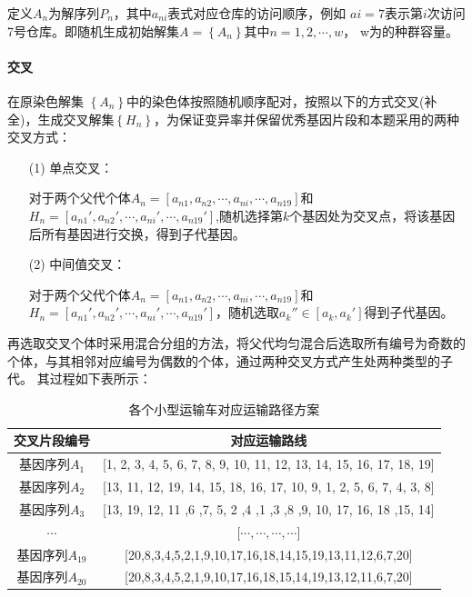 \documentclass{whutmod}
\begin{document}
        定义$A_n$为解序列$P_{n}$，其中$a_{ni}$表式对应仓库的访问顺序，例如 $a{i}=7$表示第$i$次访问7号仓库。即随机生成初始解集$A=\left \{A_n\right \}$其中$n=1,2,\cdots,w$， w为的种群容量。
        
        \paragraph{交叉}
        在原染色解集 $\left \{ A_n \right \}$中的染色体按照随机顺序配对，按照以下的方式交叉(补全)，生成交叉解集$\left \{H_n\right \}$，为保证变异率并保留优秀基因片段和本题采用的两种交叉方式：
        
        \begin{itemize}
        	\item [(1)]单点交叉：
        	
        	对于两个父代个体$ A_n=[a_{n1},a_{n2},\cdots,a_{ni},\cdots,a_{n19}]$和$H_n=[a_{n1}',a_{n2}',\cdots,a_{ni}',\cdots,a_{n19}']$,随机选择第$k$个基因处为交叉点，将该基因后所有基因进行交换，得到子代基因。
        	\item [(2)]中间值交叉：
        	
        	对于两个父代个体$ A_n=[a_{n1},a_{n2},\cdots,a_{ni},\cdots,a_{n19}]$和	$H_n=[a_{n1}',a_{n2}',\cdots,a_{ni}',\cdots,a_{n19}']$，随机选取$a_{k}''\in [a_{k},a_{k}']$得到子代基因。
        \end{itemize}
        再选取交叉个体时采用混合分组的方法，将父代均匀混合后选取所有编号为奇数的个体，与其相邻对应编号为偶数的个体，通过两种交叉方式产生处两种类型的子代。
    	其过程如下表所示：
    	  	\begin{table}[H]
    		\centering	
    		  			\caption{各个小型运输车对应运输路径方案}\label{zhuansasgggggzai}
    		\begin{tabular}{cc}
    			\toprule[2pt]
    			\multicolumn{1}{m{3cm}}{\centering 交叉片段编号}
    			& \multicolumn{1}{m{8cm}}{\centering 对应运输路线}
    			\\
    			\midrule[1pt]
    			基因序列$A_1$ &  [1,	2,	3,	4,	5,	6,	7,	8,	9,	10,	11,	12,	13,	14,	15,	16,	17,	18,	19] \\ 
    			基因序列$A_2$ &  [13,	11,	12,	19,	14,	15,	18,	16,	17,	10,	9,	1,	2,	5,	6,	7,	4,	3,	8] \\ 
    			基因序列$A_3$ &  [13,	19,	12,	11	,6	,7,	5,	2	,4	,1	,3	,8	,9,	10,	17,	16,	18	,15,	14] \\ 
    			$\cdots$ & [$\cdots, \cdots, \cdots, \cdots$] \\ 
    			基因序列$A_{19}$ &  [20,8,3,4,5,2,1,9,10,17,16,18,14,15,19,13,11,12,6,7,20]\\ 
    			基因序列$A_{20}$ &  [20,8,3,4,5,2,1,9,10,17,16,18,15,14,19,13,12,11,6,7,20] \\ 
    			\bottomrule[2pt]	
    		\end{tabular}
    	\end{table}
    	
\end{document}
